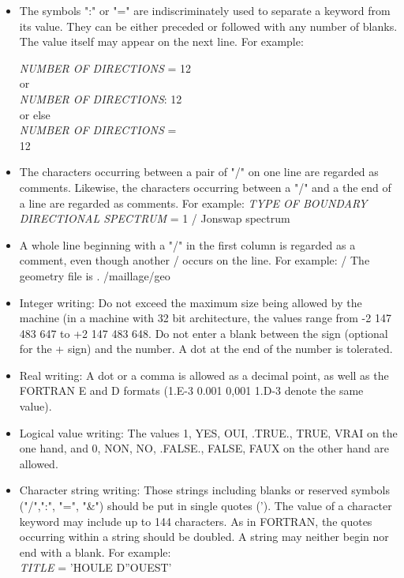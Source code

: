 \begin{itemize}
\item  The symbols ":" or "=" are indiscriminately used to separate a keyword from its
  value. They can be either preceded or followed with any number of blanks. The value
  itself may appear on the next line. For example:    

\textit{NUMBER OF DIRECTIONS} = 12\\
or \\   \textit{NUMBER OF DIRECTIONS}: 12 \\  or else \\  \textit{NUMBER OF
  DIRECTIONS} =\\   12

\item  The characters occurring between a pair of "/" on one line are regarded as
  comments. Likewise, the characters occurring between a "/" and a the end of a line
  are regarded as comments. For example:  \textit{TYPE OF BOUNDARY DIRECTIONAL
    SPECTRUM }= 1 / Jonswap spectrum

\item  A whole line beginning with a "/" in the first column is regarded as a comment,
  even though another / occurs on the line. For example:  / The geometry file is .
  /maillage/geo

\item  Integer writing: Do not exceed the maximum size being allowed by the machine
  (in a machine with 32 bit architecture, the values range from -2 147 483 647 to
  +2 147 483 648. Do not enter a blank between the sign (optional for the + sign) and
  the number. A dot at the end of the number is tolerated.

\item  Real writing: A dot or a comma is allowed as a decimal point, as well as the
  FORTRAN E and D formats (1.E-3 0.001 0,001 1.D-3 denote the same value).

\item  Logical value writing: The values 1, YES, OUI, .TRUE., TRUE, VRAI on the one
  hand, and 0, NON, NO, .FALSE., FALSE, FAUX on the other hand are allowed.

\item  Character string writing: Those strings including blanks or reserved symbols
  ("/",":", "=", "\&") should be put in single quotes ('). The value of a character
  keyword may include up to 144 characters. As in FORTRAN, the quotes occurring within
  a string should be doubled. A string may neither begin nor end with a blank.
  For example:   \\
\textit{TITLE} = 'HOULE D''OUEST'
\end{itemize}

